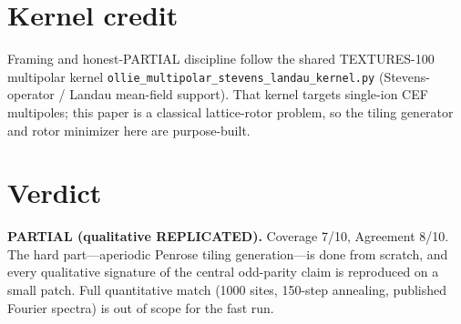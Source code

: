 \documentclass[11pt]{article}
\begin{document}
\section{Kernel credit}
Framing and honest-PARTIAL discipline follow the shared TEXTURES-100 multipolar
kernel \texttt{ollie\_multipolar\_stevens\_landau\_kernel.py} (Stevens-operator /
Landau mean-field support). That kernel targets single-ion CEF multipoles; this
paper is a classical lattice-rotor problem, so the tiling generator and rotor
minimizer here are purpose-built.

\section{Verdict}
\textbf{PARTIAL (qualitative REPLICATED).} Coverage 7/10, Agreement 8/10.
The hard part---aperiodic Penrose tiling generation---is done from scratch, and
every qualitative signature of the central odd-parity claim is reproduced on a
small patch. Full quantitative match (1000 sites, 150-step annealing, published
Fourier spectra) is out of scope for the fast run.
\end{document}
